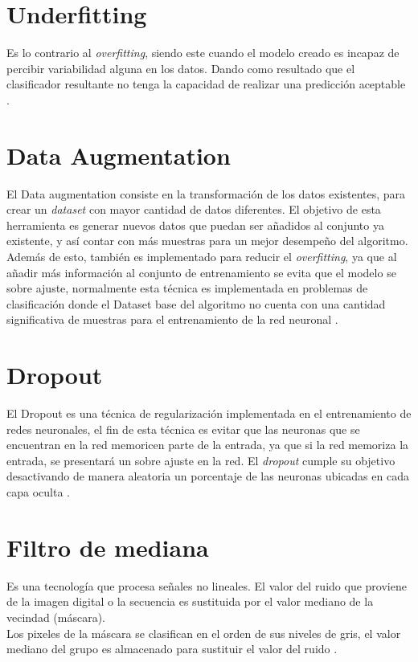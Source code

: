 \section{Underfitting}

Es lo contrario al \textit{overfitting}, siendo este cuando el modelo creado es incapaz de percibir variabilidad alguna en los datos. Dando como resultado que el clasificador resultante no tenga la capacidad de realizar una predicción aceptable \cite{jabbar2015methods}.

\section{Data Augmentation}
El Data augmentation consiste en la transformación de los datos existentes, para crear un \textit{dataset} con mayor cantidad de datos diferentes. El objetivo de esta herramienta es generar nuevos datos que puedan ser añadidos al conjunto ya existente, y así contar con más muestras para un mejor desempeño del algoritmo. Además de esto, también es implementado para reducir el \textit{overfitting}, ya que al añadir más información al conjunto de entrenamiento se evita que el modelo se sobre ajuste, normalmente esta técnica es implementada en problemas de clasificación donde el Dataset base del algoritmo no cuenta con una cantidad significativa de muestras para el entrenamiento de la red neuronal \cite{data}. \\



\section{Dropout}

El Dropout es una técnica de regularización implementada en el entrenamiento de redes neuronales, el fin de esta técnica es evitar que las neuronas que se encuentran en la red memoricen parte de la entrada, ya que si la red memoriza la entrada, se presentará un sobre ajuste en la red. El \textit{dropout} cumple su objetivo desactivando de manera aleatoria un porcentaje de las neuronas ubicadas en cada capa oculta \cite{drop}.

\section{Filtro de mediana}

Es una tecnología que procesa señales no lineales. El valor del ruido que proviene de la imagen digital o la secuencia es sustituida por el valor mediano de la vecindad (máscara).\\
Los pixeles de la máscara se clasifican en el orden de sus niveles de gris, el valor mediano del grupo es almacenado para sustituir el valor del ruido \cite{zhu2012improved}.

